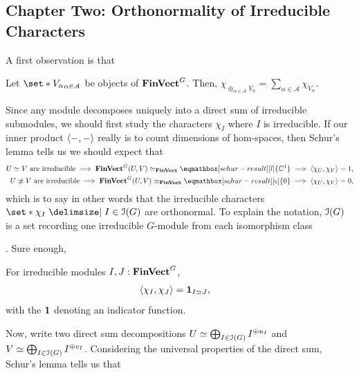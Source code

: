 \subsection{Chapter Two: Orthonormality of Irreducible Characters} %
\par A first observation is that
\begin{lemma}
\label{result:character-direct-sum}
  \pan Let $\set*{ V_{\alpha} }_{\alpha \in \mathcal{A}}$ be objects of $\operatorname{\mathbf{FinVect}}^G$. Then, $\chi_{\oplus_{\alpha \in \mathcal{A}} V_{\alpha}} = \sum_{\alpha \in \mathcal{A}} \chi_{V_{\alpha}}$.
\end{lemma}
\par Since any module decomposes uniquely into a direct sum of irreducible submodules, we should first study the characters $\chi_{I}$ where $I$ is irreducible. If our inner product $\langle {-}, {-} \rangle$ really is to count dimensions of hom-spaces, then Schur's lemma tells us we should expect that
\begin{align*}
  U \simeq V \text{ are irreducible}
  \implies
  \FinVect^G (U, V) \simeq_{\FinVect} \eqmathbox[schur-result][l]{\mathbb{C}^1}
  \implies
  \langle \chi_U, \chi_V \rangle
  = 1
  ,
  \\
  U \not\simeq V \text{ are irreducible}
  \implies
  \FinVect^G (U, V) \simeq_{\FinVect} \eqmathbox[schur-result][c]{0}
  \implies
  \langle \chi_U, \chi_V \rangle
  = 0
  ,
\end{align*}
which is to say in other words that the irreducible characters $\set*{ \chi_I \given I \in \Irred(G) }$ are orthonormal. To explain the notation, $\operatorname{\mathcal{I}}(G)$ is a set recording one irreducible $G$-module from each isomorphism class . Sure enough,
\begin{proposition}
\label{result:orthogonality}
  \pan For irreducible modules $I, J : \operatorname{\mathbf{FinVect}}^G$,
  \begin{align*}
    \langle \chi_I, \chi_J \rangle
    &= \mathbf{1}_{I \simeq J}
    ,
  \end{align*}
  with the $\mathbf{1}$ denoting an indicator function. 
\end{proposition}
\par Now, write two direct sum decompositions $U \simeq \bigoplus_{I \in \operatorname{\mathcal{I}}(G)} I^{\oplus u_I}$ and $V \simeq \bigoplus_{I \in \operatorname{\mathcal{I}}(G)} I^{\oplus v_I}$. Considering the universal properties of the direct sum, Schur's lemma tells us that
